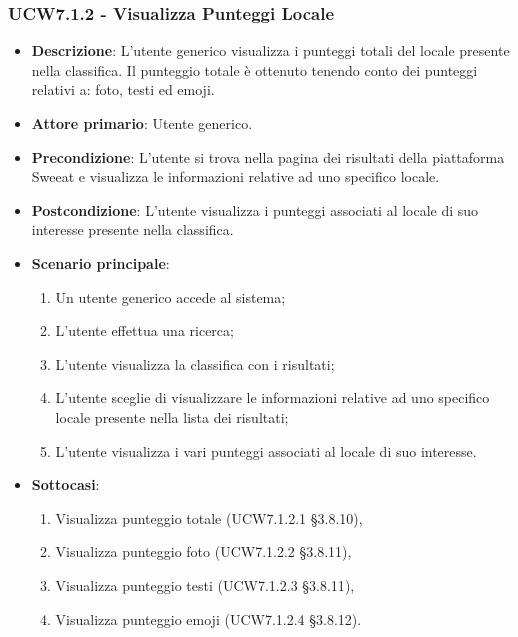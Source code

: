\subsubsection{UCW7.1.2 - Visualizza Punteggi Locale}
\begin{itemize}
	\item \textbf{Descrizione}: L'utente generico visualizza i punteggi totali del locale presente nella classifica. Il punteggio totale è ottenuto tenendo conto dei punteggi relativi a: foto, testi ed emoji.
    \item \textbf{Attore primario}: Utente generico.
    \item \textbf{Precondizione}: L’utente si trova nella pagina dei risultati della piattaforma Sweeat e visualizza le informazioni relative ad uno specifico locale.
    \item \textbf{Postcondizione}: L’utente visualizza i punteggi associati al locale di suo interesse presente nella classifica.
    \item \textbf{Scenario principale}: 
    \begin{enumerate}
        \item Un utente generico accede al sistema;
        \item L’utente effettua una ricerca;
        \item L'utente visualizza la classifica con i risultati;
        \item L'utente sceglie di visualizzare le informazioni relative ad uno specifico locale presente nella lista dei risultati;
        \item L'utente visualizza i vari punteggi associati al locale di suo interesse.
    \end{enumerate}
    \item \textbf{Sottocasi}:
    \begin{enumerate}
	\item Visualizza punteggio totale (UCW7.1.2.1 \S{3.8.10}),
	\item Visualizza punteggio foto (UCW7.1.2.2 \S{3.8.11}), 
	\item Visualizza punteggio testi (UCW7.1.2.3 \S{3.8.11}),
	\item Visualizza punteggio emoji (UCW7.1.2.4 \S{3.8.12}).		
	\end{enumerate} 
\end{itemize}

